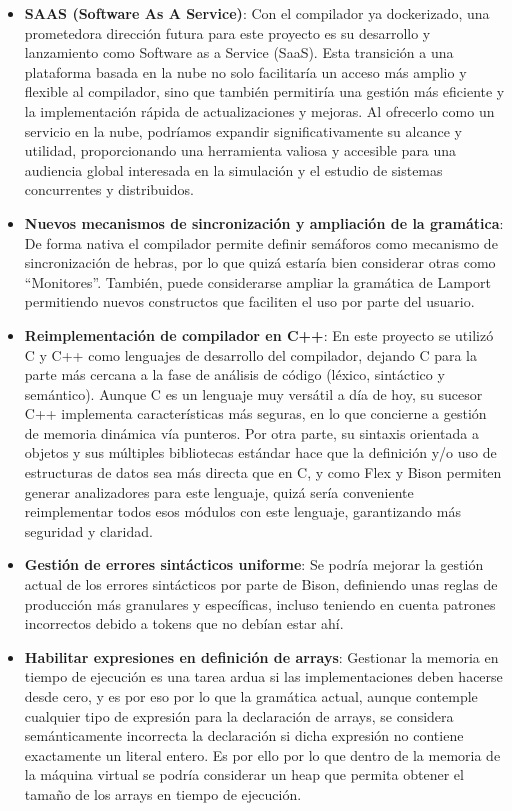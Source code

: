 \begin{itemize}
    \item \textbf{SAAS (Software As A Service)}: Con el compilador ya dockerizado, una prometedora dirección futura para este proyecto es su desarrollo y lanzamiento como Software as a Service (SaaS). Esta transición a una plataforma basada en la nube no solo facilitaría un acceso más amplio y flexible al compilador, sino que también permitiría una gestión más eficiente y la implementación rápida de actualizaciones y mejoras. Al ofrecerlo como un servicio en la nube, podríamos expandir significativamente su alcance y utilidad, proporcionando una herramienta valiosa y accesible para una audiencia global interesada en la simulación y el estudio de sistemas concurrentes y distribuidos.
    \item \textbf{Nuevos mecanismos de sincronización y ampliación de la gramática}: De forma nativa el compilador permite definir semáforos como mecanismo de sincronización de hebras, por lo que quizá estaría bien considerar otras como ``Monitores''. También, puede considerarse ampliar la gramática de Lamport permitiendo nuevos constructos que faciliten el uso por parte del usuario.
    \item \textbf{Reimplementación de compilador en C++}: En este proyecto se utilizó C y C++ como lenguajes de desarrollo del compilador, dejando C para la parte más cercana a la fase de análisis de código (léxico, sintáctico y semántico). Aunque C es un lenguaje muy versátil a día de hoy, su sucesor C++ implementa características más seguras, en lo que concierne a gestión de memoria dinámica vía punteros. Por otra parte, su sintaxis orientada a objetos y sus múltiples bibliotecas estándar hace que la definición y/o uso de estructuras de datos sea más directa que en C, y como Flex y Bison permiten generar analizadores para este lenguaje, quizá sería conveniente reimplementar todos esos módulos con este lenguaje, garantizando más seguridad y claridad.
    \item \textbf{Gestión de errores sintácticos uniforme}: Se podría mejorar la gestión actual de los errores sintácticos por parte de Bison, definiendo unas reglas de producción más granulares y específicas, incluso teniendo en cuenta patrones incorrectos debido a tokens que no debían estar ahí.
    \item \textbf{Habilitar expresiones en definición de arrays}: Gestionar la memoria en tiempo de ejecución es una tarea ardua si las implementaciones deben hacerse desde cero, y es por eso por lo que la gramática actual, aunque contemple cualquier tipo de expresión para la declaración de arrays, se considera semánticamente incorrecta la declaración si dicha expresión no contiene exactamente un literal entero. Es por ello por lo que dentro de la memoria de la máquina virtual se podría considerar un heap que permita obtener el tamaño de los arrays en tiempo de ejecución.

\end{itemize}

